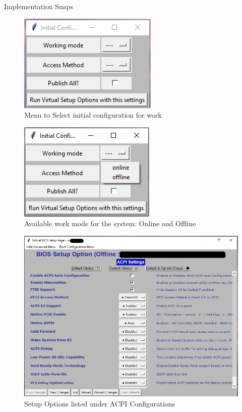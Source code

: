 \begin{frame}[allowframebreaks]{Implementation Snaps}
    
    \begin{figure}[htbp]
        \centering
        \includegraphics[width=0.6\linewidth]{Im/figures/proposed-work/bios-gui-initial-config}
        \caption{Menu to Select initial configuration for work}\label{fig:proposed-work-bios-gui-initial-config}
    \end{figure}
    
    \begin{figure}[htbp]
        \centering
        \includegraphics[width=0.6\linewidth]{Im/figures/proposed-work/bios-gui-initial-config-select-mode}
        \caption{Available work mode for the system: Online and Offline}\label{fig:proposed-work-bios-gui-initial-config-select-mode}
    \end{figure}

    \begin{figure}[htbp]
        \centering
        \includegraphics[width=0.6\linewidth]{Im/figures/proposed-work/bios-gui-acpi-knobs}
        \caption{Setup Options listed under ACPI Configurations}\label{fig:proposed-work-bios-gui-acpi-knobs}
    \end{figure}


\end{frame}
